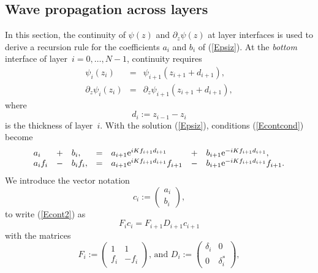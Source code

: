 \subsection{Wave propagation across layers}

In this section,
the continuity of $\psi(z)$ and $\partial_z\psi(z)$ at layer interfaces
is used to derive a recursion rule
for the coefficients $a_i$ and $b_i$ of (\ref{Epsiz}).
At the \textit{bottom} interface of layer~$i=0,\ldots,N-1$,
continuity requires
\begin{equation}\label{Econtcond}
  \begin{array}{lcl}
            \psi_{i}(z_i)&=&\psi_{i+1}(z_{i+1}+d_{i+1}),\\
            \partial_z\psi_{i}(z_i)&=&\partial_z\psi_{i+1}(z_{i+1}+d_{i+1}),
  \end{array}
\end{equation}
  where
\begin{equation}
  d_i:=z_{i-1}-z_{i}
\end{equation}
is the thickness of layer~$i$.
With the solution (\ref{Epsiz}), conditions (\ref{Econtcond}) become
\begin{equation}\label{Econt2}
  \begin{array}{lclclcl}
  a_i &+& b_i,
  &=&
  a_{i+1}{\rm e}^{iKf_{i+1}d_{i+1}} &+& b_{i+1}{\rm e}^{-iKf_{i+1}d_{i+1}},
  \\
  a_i f_i  &-& b_i f_i,
  &=&
 a_{i+1}{\rm e}^{iKf_{i+1}d_{i+1}} f_{i+1} &-& b_{i+1}{\rm e}^{-iKf_{i+1}d_{i+1}} f_{i+1}.
  \end{array}
\end{equation}
We introduce the vector notation
\begin{equation}\label{Evecc}
  c_i := \left( \begin{array}{c}a_i\\b_i\end{array} \right),
\end{equation}
to write (\ref{Econt2}) as
\begin{equation}\label{EFcFDc}
  F_i c_i = F_{i+1} D_{i+1} c_{i+1}
\end{equation}
with the matrices
\begin{equation}
  F_i := \left(\begin{array}{cc}1&1\\f_i&-f_i\end{array}\right)\text{, and }
  D_i := \left(\begin{array}{cc}\delta_i&0\\0&\delta_i^*\end{array}\right),
\end{equation}
